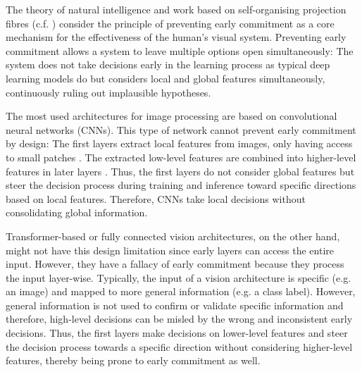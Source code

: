 The theory of natural intelligence  and work based on self-organising projection fibres \cite{bienenstock_neural_1987, lades_distortion_1993, wiskott_face_1996, wiskott_face_1997, wolfrum_recurrent_2008, fernandes_self-organization_2015} (c.f. ) consider the principle of preventing early commitment as a core mechanism for the effectiveness of the human's visual system.
Preventing early commitment allows a system to leave multiple options open simultaneously: The system does not take decisions early in the learning process as typical deep learning models do but considers local and global features simultaneously, continuously ruling out implausible hypotheses.

The most used architectures for image processing are based on convolutional neural networks  (CNNs). This type of network cannot prevent early commitment by design: The first layers extract local features from images, only having access to small patches \cite{lecun_backpropagation_1989}. The extracted low-level features are combined into higher-level features in later layers . Thus, the first layers do not consider global features but steer the decision process during training and inference toward specific directions based on local features. Therefore, CNNs take local decisions without consolidating global information.

Transformer-based  or fully connected  vision architectures, on the other hand, might not have this design limitation since early layers can access the entire input.
However, they have a fallacy of early commitment because they process the input layer-wise. Typically, the input of a vision architecture is specific (e.g. an image) and mapped to more general information (e.g. a class label).
However, general information is not used to confirm or validate specific information and therefore, high-level decisions can be misled by the wrong and inconsistent early decisions.
Thus, the first layers make decisions on lower-level features and steer the decision process towards a specific direction without considering higher-level features, thereby being prone to early commitment as well.

